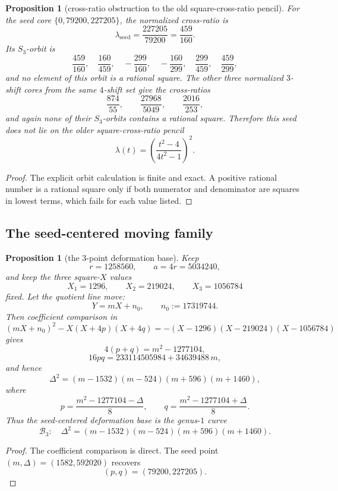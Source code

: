 \documentclass[11pt]{article}
\theoremstyle{plainbreak}
\newtheorem{proposition}[theorem]{Proposition}
\theoremstyle{defbreak}
\begin{document}
\begin{proposition}[cross-ratio obstruction to the old square-cross-ratio pencil]
For the seed core $\{0,79200,227205\}$, the normalized cross-ratio is
\[
\lambda_{\mathrm{seed}}=\frac{227205}{79200}=\frac{459}{160}.
\]
Its $S_3$-orbit is
\[
\frac{459}{160},\quad
\frac{160}{459},\quad
-\frac{299}{160},\quad
-\frac{160}{299},\quad
\frac{299}{459},\quad
\frac{459}{299},
\]
and no element of this orbit is a rational square.  The other three normalized $3$-shift cores from the same $4$-shift set give the cross-ratios
\[
\frac{874}{55},\qquad \frac{27968}{5049},\qquad \frac{2016}{253},
\]
and again none of their $S_3$-orbits contains a rational square. Therefore this seed does \emph{not} lie on the older square-cross-ratio pencil
\[
\lambda(t)=\left(\frac{t^2-4}{4t^2-1}\right)^2.
\]
\end{proposition}

\begin{proof}
The explicit orbit calculation is finite and exact.  A positive rational number is a rational square only if both numerator and denominator are squares in lowest terms, which fails for each value listed.
\end{proof}

\subsection{The seed-centered moving family}

\begin{proposition}[the $3$-point deformation base]
Keep
\[
r=1258560,\qquad a=4r=5034240,
\]
and keep the three square-$X$ values
\[
X_1=1296,\qquad X_2=219024,\qquad X_3=1056784
\]
fixed.  Let the quotient line move:
\[
Y=mX+n_0,\qquad n_0:=17319744.
\]
Then coefficient comparison in
\[
(mX+n_0)^2-X(X+4p)(X+4q)=-(X-1296)(X-219024)(X-1056784)
\]
gives
\[
4(p+q)=m^2-1277104,
\]
\[
16pq=233114505984+34639488\,m,
\]
and hence
\[
\Delta^2=(m-1532)(m-524)(m+596)(m+1460),
\]
where
\[
p=\frac{m^2-1277104-\Delta}{8},
\qquad
q=\frac{m^2-1277104+\Delta}{8}.
\]
Thus the seed-centered deformation base is the genus-$1$ curve
\[
\mathcal B_3:\quad
\Delta^2=(m-1532)(m-524)(m+596)(m+1460).
\]
\end{proposition}

\begin{proof}
The coefficient comparison is direct. The seed point $(m,\Delta)=(1582,592020)$ recovers
\[
(p,q)=(79200,227205).
\]
\end{proof}
\end{document}
